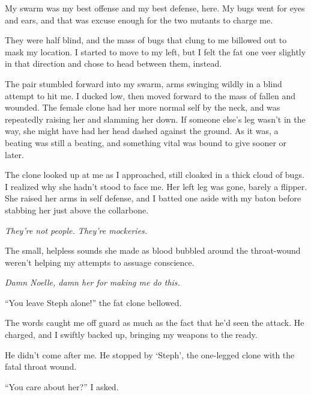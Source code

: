 My swarm was my best offense and my best defense, here.  My bugs went for eyes and ears, and that was excuse enough for the two mutants to charge me.



They were half blind, and the mass of bugs that clung to me billowed out to mask my location.  I started to move to my left, but I felt the fat one veer slightly in that direction and chose to head between them, instead.



The pair stumbled forward into my swarm, arms swinging wildly in a blind attempt to hit me.  I ducked low, then moved forward to the mass of fallen and wounded.  The female clone had her more normal self by the neck, and was repeatedly raising her and slamming her down.  If someone else's leg wasn't in the way, she might have had her head dashed against the ground.  As it was, a beating was still a beating, and something vital was bound to give sooner or later.



The clone looked up at me as I approached, still cloaked in a thick cloud of bugs. I realized why she hadn't stood to face me.  Her left leg was gone, barely a flipper.  She raised her arms in self defense, and I batted one aside with my baton before stabbing her just above the collarbone.



\emph{They're not people.  They're mockeries.}



The small, helpless sounds she made as blood bubbled around the throat-wound weren't helping my attempts to assuage conscience.



\emph{Damn Noelle, damn her for making me do this.}



``You leave Steph alone!'' the fat clone bellowed.



The words caught me off guard as much as the fact that he'd seen the attack.  He charged, and I swiftly backed up, bringing my weapons to the ready.



He didn't come after me.  He stopped by `Steph', the one-legged clone with the fatal throat wound.



``You care about her?'' I asked.



